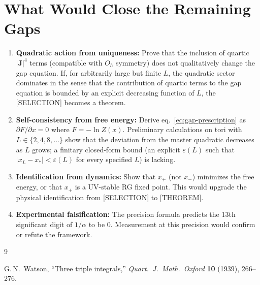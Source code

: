 \documentclass[12pt]{article}
\theoremstyle{definition}
\theoremstyle{remark}
\begin{document}
\section{What Would Close the Remaining Gaps}

\begin{enumerate}
    \item \textbf{Quadratic action from uniqueness:} Prove that the inclusion of quartic $|\mathbf{J}|^4$ terms (compatible with $O_h$ symmetry) does not qualitatively change the gap equation. If, for arbitrarily large but finite $L$, the quadratic sector dominates in the sense that the contribution of quartic terms to the gap equation is bounded by an explicit decreasing function of $L$, the [SELECTION] becomes a theorem.

    \item \textbf{Self-consistency from free energy:} Derive eq.~\eqref{eq:gap-prescription} as $\partial F / \partial x = 0$ where $F = -\ln Z(x)$. Preliminary calculations on tori with $L \in \{2, 4, 8, \ldots\}$ show that the deviation from the master quadratic decreases as $L$ grows; a finitary closed-form bound (an explicit $\varepsilon(L)$ such that $|x_L - x_*| < \varepsilon(L)$ for every specified $L$) is lacking.

    \item \textbf{Identification from dynamics:} Show that $x_+$ (not $x_-$) minimizes the free energy, or that $x_+$ is a UV-stable RG fixed point. This would upgrade the physical identification from [SELECTION] to [THEOREM].

    \item \textbf{Experimental falsification:} The precision formula predicts the 13th significant digit of $1/\alpha$ to be 0. Measurement at this precision would confirm or refute the framework.
\end{enumerate}

\begin{thebibliography}{9}

G.\,N.\ Watson, ``Three triple integrals,'' \textit{Quart.\ J.\ Math.\ Oxford} \textbf{10} (1939), 266--276.

\end{thebibliography}
\end{document}
